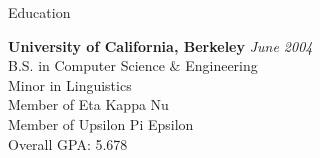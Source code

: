 \documentclass{resume} %
\begin{document}

\begin{rSection}{Education}

{\bf University of California, Berkeley} \hfill {\em June 2004} \\ 
B.S. in Computer Science \& Engineering \\
Minor in Linguistics \smallskip \\
Member of Eta Kappa Nu \\
Member of Upsilon Pi Epsilon \\
Overall GPA: 5.678

\end{rSection}

\end{document}
